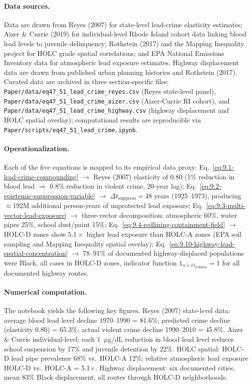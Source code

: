 \paragraph{Data sources.}
Data are drawn from Reyes (2007) \cite{reyes2007} for state-level lead-crime elasticity estimates; Aizer \& Currie (2019) \cite{aizer_currie} for individual-level Rhode Island cohort data linking blood lead levels to juvenile delinquency; Rothstein (2017) \cite{rothstein} and the Mapping Inequality project \cite{mapping_inequality} for HOLC grade spatial correlations; and EPA National Emissions Inventory data for atmospheric lead exposure estimates. Highway displacement data are drawn from published urban planning histories and Rothstein (2017). Curated data are archived in three section-specific files: \texttt{Paper/data/eq47\_51\_lead\_crime\_reyes.csv} (Reyes state-level panel), \texttt{Paper/data/eq47\_51\_lead\_crime\_aizer.csv} (Aizer-Currie RI cohort), and \texttt{Paper/data/eq47\_51\_lead\_crime\_highway.csv} (highway displacement and HOLC spatial overlay); computational results are reproducible via \texttt{Paper/scripts/eq47\_51\_lead\_crime.ipynb}.

\paragraph{Operationalization.}
Each of the five equations is mapped to its empirical data proxy: Eq.~\ref{eq:9.1-lead-crime-compounding} $\to$ Reyes (2007) elasticity of 0.80 (1\% reduction in blood lead $\Rightarrow$ 0.8\% reduction in violent crime, 20-year lag); Eq.~\ref{eq:9.2-epistemic-suppression-variable} $\to$ $\Delta t_{\text{suppress}} = 48$ years (1925--1973), producing $\approx$192M additional person-years of unprotected lead exposure; Eq.~\ref{eq:9.3-multi-vector-lead-exposure} $\to$ three-vector decomposition: atmospheric 60\%, water pipes 25\%, school dust/paint 15\%; Eq.~\ref{eq:9.4-redlining-containment-field} $\to$ HOLC-D zones show $5.1\times$ higher lead exposure than HOLC-A zones (EPA soil sampling and Mapping Inequality spatial overlay); Eq.~\ref{eq:9.10-highway-lead-spatial-concentration} $\to$ 78--91\% of documented highway-displaced populations were Black, all cases in HOLC-D zones, indicator function $\mathbb{1}_{x \in O_{\text{redlined}}} = 1$ for all documented highway routes.

\paragraph{Numerical computation.}
The notebook yields the following key figures. Reyes (2007) state-level data: average blood lead level decline 1970--1990 = 81.6\%; predicted crime decline (elasticity 0.80) = 65.3\%; actual violent crime decline 1990--2010 = 45.8\%. Aizer \& Currie individual-level: each 1~$\mu$g/dL reduction in blood lead level reduces school suspension by 17\% and juvenile detention by 22\%. HOLC spatial: HOLC-D lead pipe prevalence 68\% vs.\ HOLC-A 12\%; relative atmospheric lead exposure HOLC-D vs.\ HOLC-A = 5.1$\times$. Highway displacement: six documented cities, mean 83\% Black displacement, all routes through HOLC-D neighborhoods.


